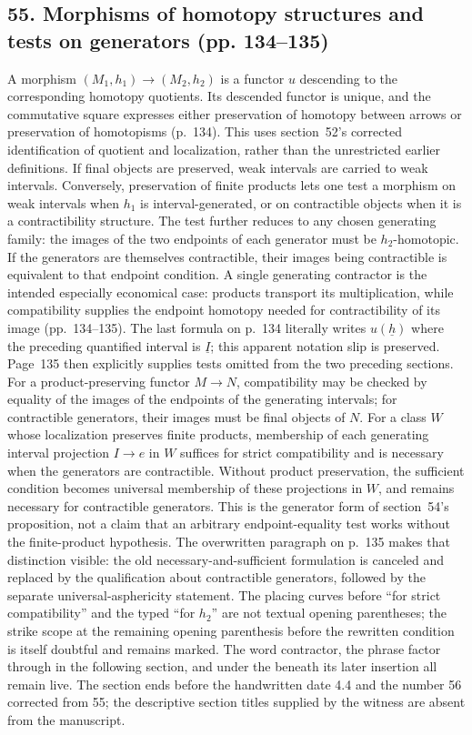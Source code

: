 \documentclass[10pt,oneside]{book}
\begin{document}
\subsection*{55. Morphisms of homotopy structures and tests on generators (pp. 134--135)}
A morphism $(M_1,h_1)\to(M_2,h_2)$ is a functor $u$ descending to the corresponding homotopy quotients. Its descended functor is unique, and the commutative square expresses either preservation of homotopy between arrows or preservation of homotopisms (p.~134). This uses section~52's corrected identification of quotient and localization, rather than the unrestricted earlier definitions. If final objects are preserved, weak intervals are carried to weak intervals. Conversely, preservation of finite products lets one test a morphism on weak intervals when $h_1$ is interval-generated, or on contractible objects when it is a contractibility structure. The test further reduces to any chosen generating family: the images of the two endpoints of each generator must be $h_2$-homotopic. If the generators are themselves contractible, their images being contractible is equivalent to that endpoint condition. A single generating contractor is the intended especially economical case: products transport its multiplication, while compatibility supplies the endpoint homotopy needed for contractibility of its image (pp.~134--135). The last formula on p.~134 literally writes $u(\underline h)$ where the preceding quantified interval is $\underline I$; this apparent notation slip is preserved. Page~135 then explicitly supplies tests omitted from the two preceding sections. For a product-preserving functor $M\to N$, compatibility may be checked by equality of the images of the endpoints of the generating intervals; for contractible generators, their images must be final objects of $N$. For a class $W$ whose localization preserves finite products, membership of each generating interval projection $I\to e$ in $W$ suffices for strict compatibility and is necessary when the generators are contractible. Without product preservation, the sufficient condition becomes universal membership of these projections in $W$, and remains necessary for contractible generators. This is the generator form of section~54's proposition, not a claim that an arbitrary endpoint-equality test works without the finite-product hypothesis. The overwritten paragraph on p.~135 makes that distinction visible: the old necessary-and-sufficient formulation is canceled and replaced by the qualification about contractible generators, followed by the separate universal-asphericity statement. The placing curves before ``for strict compatibility'' and the typed ``for $h_2$'' are not textual opening parentheses; the strike scope at the remaining opening parenthesis before the rewritten condition is itself doubtful and remains marked. The word contractor, the phrase factor through in the following section, and under the beneath its later insertion all remain live. The section ends before the handwritten date 4.4 and the number 56 corrected from 55; the descriptive section titles supplied by the witness are absent from the manuscript.
\end{document}
